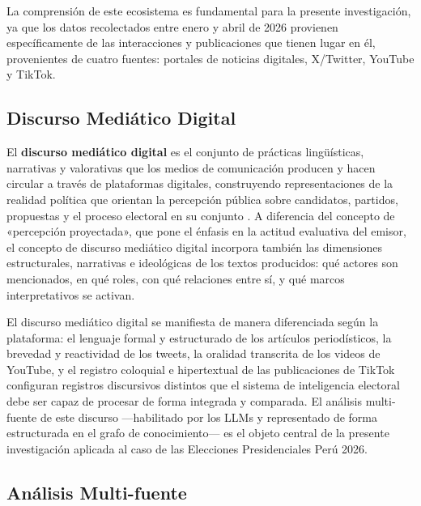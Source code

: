La comprensión de este ecosistema es fundamental para la presente investigación, ya que los datos recolectados entre enero y abril de 2026 provienen específicamente de las interacciones y publicaciones que tienen lugar en él, provenientes de cuatro fuentes: portales de noticias digitales, X/Twitter, YouTube y TikTok.

\subsection{Discurso Mediático Digital}

El \textbf{discurso mediático digital} es el conjunto de prácticas lingüísticas, narrativas y valorativas que los medios de comunicación producen y hacen circular a través de plataformas digitales, construyendo representaciones de la realidad política que orientan la percepción pública sobre candidatos, partidos, propuestas y el proceso electoral en su conjunto \parencite{bk_fairclough2003analysing}. A diferencia del concepto de «percepción proyectada», que pone el énfasis en la actitud evaluativa del emisor, el concepto de discurso mediático digital incorpora también las dimensiones estructurales, narrativas e ideológicas de los textos producidos: qué actores son mencionados, en qué roles, con qué relaciones entre sí, y qué marcos interpretativos se activan.

El discurso mediático digital se manifiesta de manera diferenciada según la plataforma: el lenguaje formal y estructurado de los artículos periodísticos, la brevedad y reactividad de los tweets, la oralidad transcrita de los videos de YouTube, y el registro coloquial e hipertextual de las publicaciones de TikTok configuran registros discursivos distintos que el sistema de inteligencia electoral debe ser capaz de procesar de forma integrada y comparada. El análisis multi-fuente de este discurso —habilitado por los LLMs y representado de forma estructurada en el grafo de conocimiento— es el objeto central de la presente investigación aplicada al caso de las Elecciones Presidenciales Perú 2026.

\subsection{Análisis Multi-fuente}

